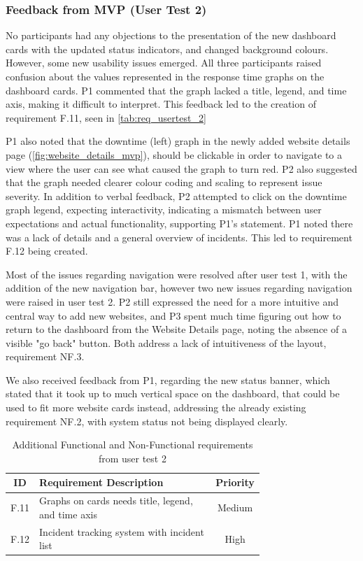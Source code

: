 \subsubsection{Feedback from MVP (User Test 2)}  
No participants had any objections to the presentation of the new dashboard cards with the updated status indicators, and changed background colours. However, some new usability issues emerged. All three participants raised confusion about the values represented in the response time graphs on the dashboard cards. P1 commented that the graph lacked a title, legend, and time axis, making it difficult to interpret. This feedback led to the creation of requirement F.11, seen in \autoref{tab:req_usertest_2}

P1 also noted that the downtime (left) graph in the newly added website details page (\autoref{fig:website_details_mvp}),  should be clickable in order to navigate to a view where the user can see what caused the graph to turn red. P2 also suggested that the graph needed clearer colour coding and scaling to represent issue severity.  In addition to verbal feedback, P2 attempted to click on the downtime graph legend, expecting interactivity, indicating a mismatch between user expectations and actual functionality, supporting P1's statement. P1 noted there was a lack of details and a general overview of incidents. This led to requirement F.12 being created.

Most of the issues regarding navigation were resolved after user test 1, with the addition of the new navigation bar, however two new issues regarding navigation were raised in user test 2. P2 still expressed the need for a more intuitive and central way to add new websites, and P3 spent much time figuring out how to return to the dashboard from the Website Details page, noting the absence of a visible "go back" button. Both address a lack of intuitiveness of the layout, requirement NF.3. 

We also received feedback from P1, regarding the new status banner, which stated that it took up to much vertical space on the dashboard, that could be used to fit more website cards instead, addressing the already existing requirement NF.2, with system status not being displayed clearly. 

\begin{table}
    \centering
    \begin{tabular}{|c|p{0.72\linewidth}|c|} \hline
    \textbf{ID} & \textbf{Requirement Description} & \textbf{Priority} \\ \hline
         F.11&  Graphs on cards needs title, legend, and time axis& Medium\\ \hline 
         F.12&  Incident tracking system with incident list& High\\\hline
    \end{tabular}
    \caption{Additional Functional and Non-Functional requirements from user test 2}
    \label{tab:req_usertest_2}
\end{table}


